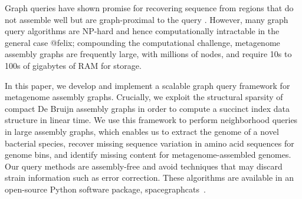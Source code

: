 Graph queries have shown promise for recovering sequence from regions that do
not assemble well but are graph-proximal to the query \cite{metacherchant,perchlorate}. However, many graph query
algorithms are NP-hard and hence computationally intractable in the
general case @felix; compounding the computational challenge, metagenome assembly
graphs are frequently large, with millions of nodes, and require 10s
to 100s of gigabytes of RAM for storage.

In this paper, we develop and implement a scalable graph query
framework for metagenome assembly graphs. Crucially, we exploit the structural sparsity of compact De Bruijn
assembly graphs in order to compute a succinct index data structure in linear
time. We use this framework to perform neighborhood
queries in large assembly graphs, which enables us to extract the
genome of a novel bacterial species, recover missing sequence
variation in amino acid sequences for genome bins, and identify
missing content for metagenome-assembled genomes.  Our query methods
are assembly-free and avoid techniques that
may discard strain information such as error correction.  These algorithms are available in an
open-source Python software package,
\textsf{spacegraphcats}~\cite{spacegraphcats}.

